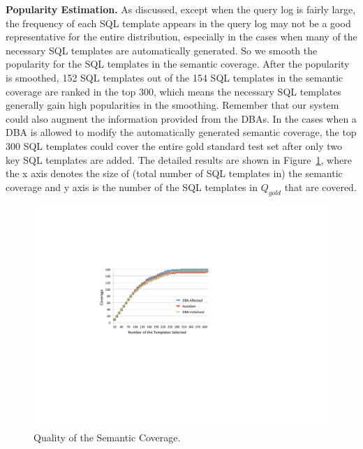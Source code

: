 \documentclass{vldb}
\begin{document}
\textbf{Popularity Estimation.}
As discussed, except when the query log is fairly large, the frequency of each SQL template appears in the query log may not be a good representative for the entire distribution, especially in the cases when many of the necessary SQL templates are automatically generated.  So we smooth the popularity for the SQL templates in the semantic coverage.  After the popularity is smoothed, 152 SQL templates out of the 154 SQL templates in the semantic coverage are ranked in the top 300, which means the necessary SQL templates generally gain high popularities in the smoothing.  Remember that our system could also augment the information provided from the DBAs.  In the cases when a DBA is allowed to modify the automatically generated semantic coverage, the top 300 SQL templates could cover the entire gold standard test set after only two key SQL templates are added.  The detailed results are shown in Figure~\ref{fig:experimentsOffline}, where the x axis denotes the size of (total number of SQL templates in) the semantic coverage and y axis is the number of the SQL templates in $Q_{gold}$ that are covered.  

\begin{figure}[h]
  \includegraphics[width=0.9\linewidth]{pic/experimentsOffline}
  \caption{Quality of the Semantic Coverage.}
  \label{fig:experimentsOffline}
\end{figure}
\end{document}
